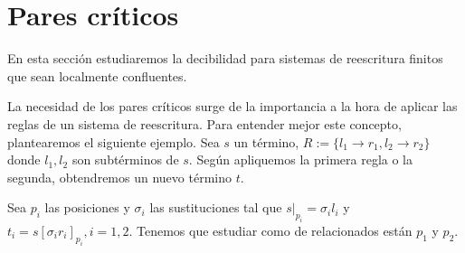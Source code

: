 \section{Pares críticos}

En esta sección estudiaremos la decibilidad para sistemas de
reescritura finitos que sean localmente confluentes.

La necesidad de los pares críticos surge de la importancia a la hora
de aplicar las reglas de un sistema de reescritura. Para entender
mejor este concepto, plantearemos el siguiente ejemplo. Sea $s$ un
término, $R := \{ l_1 \rightarrow r_1, l_2 \rightarrow r_2 \}$ donde
$l_1, l_2$ son subtérminos de $s$. Según apliquemos la primera regla o
la segunda, obtendremos un nuevo término $t$.

\begin{figure}[h]
  \centering
\end{figure}

Sea $p_i$ las posiciones y $\sigma_i$ las sustituciones tal que
$s|_{p_i} = \sigma_i l_i$ y $t_i = s[\sigma_i r_i ]_{p_i}, i
=1,2$. Tenemos que estudiar como de relacionados están $p_1$ y $p_2$.

